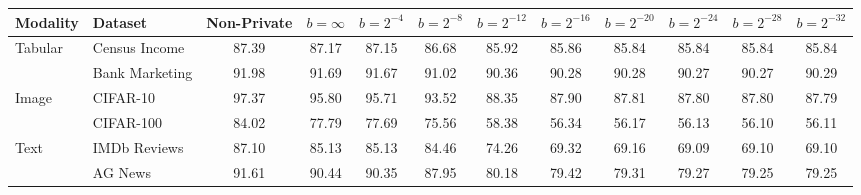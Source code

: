 \begin{tabular}{llcccccccccc}
\toprule
Modality & Dataset & Non-Private & $b=\infty$ & $b=2^{-4}$ & $b=2^{-8}$ & $b=2^{-12}$ & $b=2^{-16}$ & $b=2^{-20}$ & $b=2^{-24}$ & $b=2^{-28}$ & $b=2^{-32}$ \\
\midrule
\multirow{2}{*}{Tabular} & Census Income & 87.39 & 87.17 & 87.15 & 86.68 & 85.92 & 85.86 & 85.84 & 85.84 & 85.84 & 85.84 \\
 & Bank Marketing & 91.98 & 91.69 & 91.67 & 91.02 & 90.36 & 90.28 & 90.28 & 90.27 & 90.27 & 90.29 \\
\midrule
\multirow{2}{*}{Image} & CIFAR-10 & 97.37 & 95.80 & 95.71 & 93.52 & 88.35 & 87.90 & 87.81 & 87.80 & 87.80 & 87.79 \\
 & CIFAR-100 & 84.02 & 77.79 & 77.69 & 75.56 & 58.38 & 56.34 & 56.17 & 56.13 & 56.10 & 56.11 \\
\midrule
\multirow{2}{*}{Text} & IMDb Reviews & 87.10 & 85.13 & 85.13 & 84.46 & 74.26 & 69.32 & 69.16 & 69.09 & 69.10 & 69.10 \\
 & AG News & 91.61 & 90.44 & 90.35 & 87.95 & 80.18 & 79.42 & 79.31 & 79.27 & 79.25 & 79.25 \\
\bottomrule
\end{tabular}
